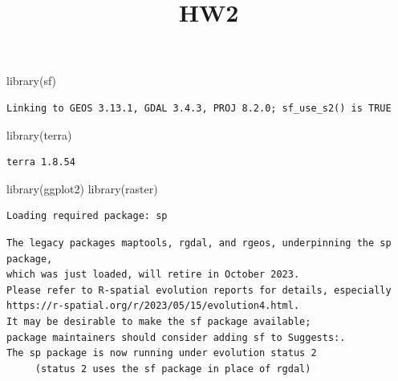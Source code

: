 \documentclass[
  letterpaper,
  DIV=11,
  numbers=noendperiod]{scrartcl}
\title{HW2}
\author{}
\date{}
\newenvironment{Shaded}{\begin{snugshade}}{\end{snugshade}}
\newcommand{\FunctionTok}[1]{\textcolor[rgb]{0.28,0.35,0.67}{#1}}
\newcommand{\NormalTok}[1]{\textcolor[rgb]{0.00,0.23,0.31}{#1}}
\begin{document}
\maketitle


\begin{Shaded}
\begin{Highlighting}[]
\FunctionTok{library}\NormalTok{(sf)}
\end{Highlighting}
\end{Shaded}

\begin{verbatim}
Linking to GEOS 3.13.1, GDAL 3.4.3, PROJ 8.2.0; sf_use_s2() is TRUE
\end{verbatim}

\begin{Shaded}
\begin{Highlighting}[]
\FunctionTok{library}\NormalTok{(terra)}
\end{Highlighting}
\end{Shaded}

\begin{verbatim}
terra 1.8.54
\end{verbatim}

\begin{Shaded}
\begin{Highlighting}[]
\FunctionTok{library}\NormalTok{(ggplot2) }
\FunctionTok{library}\NormalTok{(raster)}
\end{Highlighting}
\end{Shaded}

\begin{verbatim}
Loading required package: sp
\end{verbatim}

\begin{verbatim}
The legacy packages maptools, rgdal, and rgeos, underpinning the sp package,
which was just loaded, will retire in October 2023.
Please refer to R-spatial evolution reports for details, especially
https://r-spatial.org/r/2023/05/15/evolution4.html.
It may be desirable to make the sf package available;
package maintainers should consider adding sf to Suggests:.
The sp package is now running under evolution status 2
     (status 2 uses the sf package in place of rgdal)
\end{verbatim}
\end{document}
